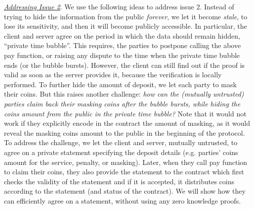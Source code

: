 \noindent\underline{\textit{Addressing Issue 2}}. We use the following ideas to address issue 2. Instead of trying to hide the information from the public \emph{forever}, we let it become \emph{stale}, to lose its sensitivity, and then it will become publicly accessible. In particular, the client and server agree on the period in which the data should remain hidden, ``private time bubble''. This requires, the parties to postpone calling the above pay function, or raising any dispute to the time when the private time bubble ends (or the bubble bursts). However, the client can still find out if the proof is valid as soon as the server provides it, because the verification is locally performed.  To further hide the amount of deposit, we let each party to mask their coins. But this raises another challenge: \textit{how can the (mutually untrusted) parties claim back their masking coins after the bubble bursts, while hiding the coins amount from the public in the private time bubble?} Note that it would not work if they explicitly encode in the contract the amount of masking, as it would reveal the masking coins amount to the public in the beginning of the protocol. To address the challenge, we let the client and server, mutually untrusted, to agree on a private statement specifying the deposit details (e.g. parties' coins amount for the service, penalty, or masking). Later, when they call pay function to claim their coins, they also provide the statement to the contract which first  checks the validity of the statement and if it is accepted, it distributes coins according to the statement (and status of the contract). We will show how they can  efficiently agree on a statement, without using any zero knowledge proofs.
 
 
 
 
